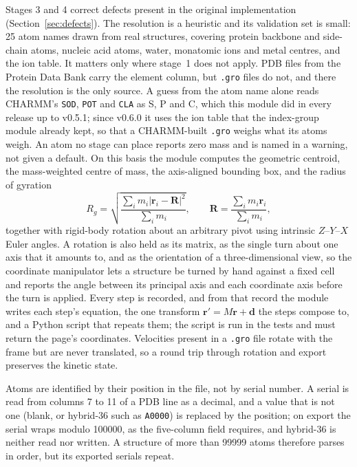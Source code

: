 \documentclass[11pt,a4paper]{article}
\begin{document}
Stages 3 and 4 correct defects present in the original implementation
(Section~\ref{sec:defects}). The resolution is a heuristic and its validation
set is small: 25 atom names drawn from real structures, covering protein
backbone and side-chain atoms, nucleic acid atoms, water, monatomic ions and
metal centres, and the ion table. It matters only where stage~1 does not apply.
PDB files from the Protein Data Bank carry the element column, but
\texttt{.gro} files do not, and there the resolution is the only source. A guess
from the atom name alone reads CHARMM's \texttt{SOD}, \texttt{POT} and
\texttt{CLA} as S, P and C, which this module did in every release up to v0.5.1;
since v0.6.0 it uses the ion table that the index-group module already kept, so
that a CHARMM-built
\texttt{.gro} weighs what its atoms weigh. An atom no stage can place reports
zero mass and is named in a warning, not given a default. On this basis the
module computes the geometric centroid, the mass-weighted centre of mass, the
axis-aligned bounding box, and the radius of gyration
\begin{equation}
  R_g = \sqrt{\frac{\sum_i m_i \left| \mathbf{r}_i - \mathbf{R} \right|^2}
                   {\sum_i m_i}},
  \qquad
  \mathbf{R} = \frac{\sum_i m_i \mathbf{r}_i}{\sum_i m_i},
\end{equation}
together with rigid-body rotation about an arbitrary pivot using intrinsic
$Z$--$Y$--$X$ Euler angles. A rotation is also held as its matrix, as the single turn about one
axis that it amounts to, and as the orientation of a three-dimensional view, so
the coordinate manipulator lets a structure be turned by hand against a fixed
cell and reports the angle between its principal axis and each coordinate axis
before the turn is applied. Every step is recorded, and from that record the
module writes each step's equation, the one transform
$\mathbf{r}' = M\mathbf{r} + \mathbf{d}$ the steps compose to, and a Python
script that repeats them; the script is run in the tests and must return the
page's coordinates. Velocities present in a \texttt{.gro} file rotate
with the frame but are never translated, so a round trip through rotation and
export preserves the kinetic state.

Atoms are identified by their position in the file, not by serial number. A
serial is read from columns 7 to 11 of a PDB line as a decimal, and a value that
is not one (blank, or hybrid-36 such as \texttt{A0000}) is replaced by the
position; on export the serial wraps modulo \num{100000}, as the five-column
field requires, and hybrid-36 is neither read nor written. A structure of more
than \num{99999} atoms therefore parses in order, but its exported serials
repeat.
\end{document}
